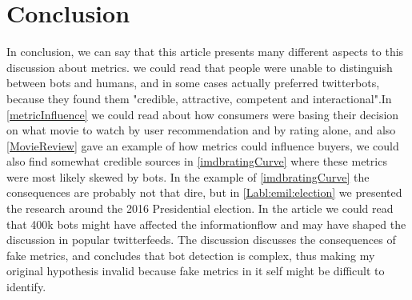 \section{Conclusion}
In conclusion, we can say that this article presents many different aspects to this discussion about metrics. we could read that people were unable to distinguish between bots and humans, and in some cases actually preferred twitterbots, because they found them "credible, attractive, competent and interactional"\cite{Edwards2014372}.In \ref{metricInfluence} we could read about how consumers were basing their decision on what movie to watch by user recommendation and by rating alone, and also \ref{MovieReview} gave an example of how metrics could influence buyers, we could also find somewhat credible sources in \ref{imdbratingCurve} where these metrics were most likely skewed by bots. In the example of \ref{imdbratingCurve} the consequences are probably not that dire, but in \ref{Labl:emil:election} we presented the research around the 2016 Presidential election. In the article we could read that 400k bots might have affected the informationflow and may have shaped the discussion in popular twitterfeeds. The discussion discusses the consequences of fake metrics, and concludes that bot detection is complex, thus making my original hypothesis invalid because fake metrics in it self might be difficult to identify. 







